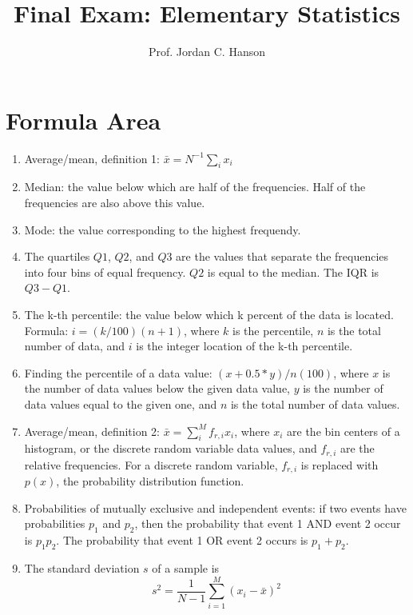 \documentclass{article}
\begin{document}
\title{Final Exam: Elementary Statistics}
\author{Prof. Jordan C. Hanson}

\maketitle

\section{Formula Area}

\begin{enumerate}
\item Average/mean, definition 1: $\bar{x} = N^{-1} \sum_i x_i$
\item Median: the value below which are half of the frequencies.  Half of the frequencies are also above this value.
\item Mode: the value corresponding to the highest frequendy.
\item The quartiles $Q1$, $Q2$, and $Q3$ are the values that separate the frequencies into four bins of equal frequency. $Q2$ is equal to the median.  The IQR is $Q3 - Q1$.
\item The k-th percentile: the value below which k percent of the data is located.  Formula: $i = (k/100) (n+1)$, where $k$ is the percentile, $n$ is the total number of data, and $i$ is the integer location of the k-th percentile.
\item Finding the percentile of a data value: $(x+0.5*y)/n (100)$, where $x$ is the number of data values below the given data value, $y$ is the number of data values equal to the given one, and $n$ is the total number of data values.
\item Average/mean, definition 2: $\bar{x} = \sum_i^{M} f_{r,i} x_i$, where $x_i$ are the bin centers of a histogram, or the discrete random variable data values, and $f_{r,i}$ are the relative frequencies.  For a discrete random variable, $f_{r,i}$ is replaced with $p(x)$, the probability distribution function.
\item Probabilities of mutually exclusive and independent events: if two events have probabilities $p_1$ and $p_2$, then the probability that event 1 AND event 2 occur is $p_1 p_2$.  The probability that event 1 OR event 2 occurs is $p_1 + p_2$.
\item The standard deviation $s$ of a sample is 
\begin{equation}
s^2 = \frac{1}{N-1}\sum_{i=1}^{M} (x_i-\bar{x})^2
\end{equation}

\end{enumerate}
\end{document}
